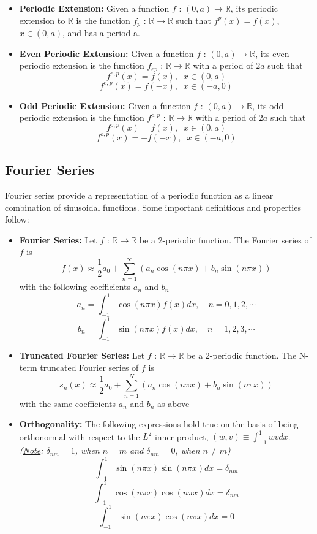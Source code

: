 \documentclass[11pt]{article}
\newcommand{\R}{\mathbb{R}}
\begin{document}
\begin{itemize}
\item \textbf{Periodic Extension:} Given a function $f$ : $(0, a) \rightarrow \R$, its periodic extension to $\R$ is the function $f_p$ : $\R \rightarrow \R$ such that
$f^p(x) = f(x)$, $x \in (0, a)$, and has a period a.
\item \textbf{Even Periodic Extension:} Given a function $f$ : $(0,a) \rightarrow \R$, its even periodic extension is the function $f_{ep}$ : $\R \rightarrow \R$ with a period of $2a$ such that $$f^{e,p}(x) = f(x), \; \; x \in (0, a)$$ $$f^{e,p}(x) = f(-x), \; \; x \in (-a, 0)$$
\item \textbf{Odd Periodic Extension:} Given a function $f$ : $(0,a) \rightarrow \R$, its odd periodic extension is the function $f^{o,p}$ : $\R \rightarrow \R$ with a period of $2a$ such that $$f^{o,p}(x) = f(x), \; \; x \in (0, a)$$ $$f^{o,p}(x) = -f(-x), \; \; x \in (-a, 0)$$
\end{itemize}

\subsection{Fourier Series}
Fourier series provide a representation of a periodic function as a linear combination of sinusoidal functions.  Some important definitions and properties follow:
\begin{itemize}
\item \textbf{Fourier Series:} Let $f$ : $\R \rightarrow \R$ be a 2-periodic function. The Fourier series of $f$ is 
$$ f(x) \approx \frac{1}{2} a_0 + \sum_{n=1}^{\infty} \left( a_n \cos (n\pi x) + b_n \sin (n\pi x) \right)$$
with the following coefficients $a_n$ and $b_n$
$$ a_n = \int_{-1}^{1} \cos (n\pi x) f(x) dx,  \quad n=0, 1,2, \cdots$$
$$ b_n = \int_{-1}^{1} \sin (n\pi x) f(x) dx,  \quad n=1,2,3, \cdots$$
\item \textbf{Truncated Fourier Series:} Let $f$ : $\R \rightarrow \R$ be a 2-periodic function. The N-term truncated Fourier series of $f$ is 
$$ s_n(x) \approx \frac{1}{2} a_0 + \sum_{n=1}^{N} \left( a_n \cos (n\pi x) + b_n \sin (n\pi x) \right)$$
with the same coefficients $a_n$ and $b_n$ as above
\item \textbf{Orthogonality:} The following expressions hold true on the basis of being orthonormal with respect to the $L^2$ inner product, $(w, v) \equiv \int _{-1}^{1} wvdx$. \textit{(\underline{Note}: $\delta_{nm} = 1$, when $n=m$ and $\delta_{nm} = 0$, when $n \neq m$)}
$$\int _{-1}^{1} \sin (n\pi x)\sin (n\pi x)dx = \delta_{nm} $$ 
$$\int _{-1}^{1} \cos (n\pi x)\cos (n\pi x)dx =\delta_{nm} $$ 
$$\int _{-1}^{1} \sin (n\pi x)\cos (n\pi x)dx =0 $$ 
\end{itemize}
\end{document}
